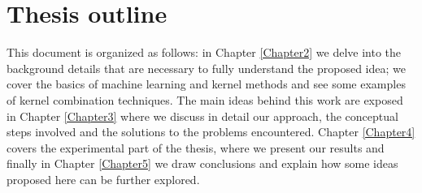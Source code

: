 \section{Thesis outline}
This document is organized as follows: in Chapter \ref{Chapter2} we delve into
the background details that are necessary to fully understand the proposed idea;
we cover the basics of machine learning and kernel methods and see some examples
of kernel combination techniques.
The main ideas behind this work are exposed in Chapter \ref{Chapter3} where we
discuss in detail our approach, the conceptual steps involved and the solutions
to the problems encountered.
Chapter \ref{Chapter4} covers the experimental part of the thesis, where we present
our results and finally in Chapter \ref{Chapter5} we draw conclusions and explain
how some ideas proposed here can be further explored.


